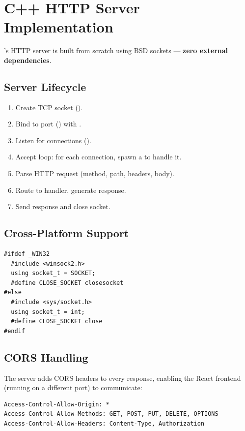 \section{C++ HTTP Server Implementation}
\label{sec:http-server}

\shiftdb{}'s HTTP server is built from scratch using BSD sockets --- \textbf{zero external dependencies}.

\subsection{Server Lifecycle}

\begin{enumerate}[nosep]
  \item Create TCP socket ().
  \item Bind to port () with .
  \item Listen for connections ().
  \item Accept loop: for each connection, spawn a  to handle it.
  \item Parse HTTP request (method, path, headers, body).
  \item Route to handler, generate response.
  \item Send response and close socket.
\end{enumerate}

\subsection{Cross-Platform Support}

\begin{lstlisting}[style=cpp, caption={Platform-specific socket abstraction.}]
#ifdef _WIN32
  #include <winsock2.h>
  using socket_t = SOCKET;
  #define CLOSE_SOCKET closesocket
#else
  #include <sys/socket.h>
  using socket_t = int;
  #define CLOSE_SOCKET close
#endif
\end{lstlisting}

\subsection{CORS Handling}

The server adds CORS headers to every response, enabling the React frontend (running on a different port) to communicate:

\begin{lstlisting}[style=cpp, caption={CORS headers in response.}, numbers=none]
Access-Control-Allow-Origin: *
Access-Control-Allow-Methods: GET, POST, PUT, DELETE, OPTIONS
Access-Control-Allow-Headers: Content-Type, Authorization
\end{lstlisting}

